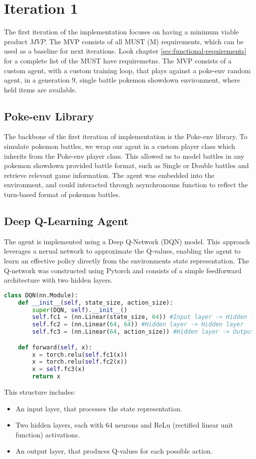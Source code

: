 \section{Iteration 1}
\label{sec:Iteration-1-Agent-Environment}

The first iteration of the implementation focuses on having a minimum viable product \(MVP\). The MVP
consists of all MUST (M) requirements, which can be used as a baseline for next iterations.
Look chapter \ref{sec:functional-requirements} for a complete list of the MUST have requiremetns.
The MVP consists of a custom agent, with a custom training loop, that plays against a poke-env random agent,
in a generation 9, single battle pokemon showdown environment, where held items are available. 

\subsection{Poke-env Library}
The backbone of the first iteration of implementation is the Poke-env library. 
To simulate pokemon battles, we wrap our agent in a custom player class which inherits from the
Poke-env player class. This allowed us to model battles in any pokemon showdown 
provided battle format, such as Single or Double battles and retrieve relevant game information.
The agent was embedded into the environment, and could interacted through asynchronouns function
to reflect the turn-based format of pokemon battles.


\subsection{Deep Q-Learning Agent}
The agent is implemented using a Deep Q-Network (DQN) model. This approach leverages
a nerual network to approximate the Q-values, enabling the agent to learn an 
effective policy directly from the environments state representation. 
The Q-network was constructed using Pytorch and consists of a simple feedforward
architecture with two hidden layers. 
\begin{lstlisting}[basicstyle=\fontsize{10}{10}\selectfont\ttfamily,language=Python,caption={The defined action space.},label=lst:action-space-def,breaklines]
class DQN(nn.Module):
    def __init__(self, state_size, action_size):
        super(DQN, self).__init__()
        self.fc1 = (nn.Linear(state_size, 64)) #Input layer -> Hidden layer
        self.fc2 = (nn.Linear(64, 64)) #Hidden layer -> Hidden layer
        self.fc3 = (nn.Linear(64, action_size)) #Hidden layer -> Output layer

    def forward(self, x):
        x = torch.relu(self.fc1(x))
        x = torch.relu(self.fc2(x))
        x = self.fc3(x)
        return x 
\end{lstlisting}
This structure includes:
\begin{itemize}
    \item An input layer, that processes the state representation.
    \item Two hidden layers, each with 64 neurons and ReLu (rectified linear unit function) activations.
    \item An output layer, that produces Q-values for each possible action.
\end{itemize}

